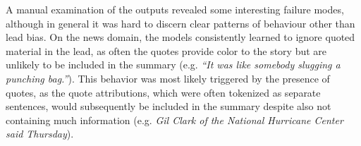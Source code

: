 A manual examination of the outputs revealed some interesting failure modes,
although in general it was hard to discern clear patterns of behaviour 
other than lead bias. On the news domain, the models consistently learned 
to ignore quoted material in the lead, as often the quotes provide
color to the story but are unlikely to be included in the summary (e.g. \textit{``It was like somebody slugging a punching bag.''}). 
This behavior was most likely triggered by the presence of quotes, as the
quote attributions, which were often tokenized as separate sentences,
would subsequently be included in the summary despite also not containing 
much information 
(e.g. \textit{Gil Clark of the National Hurricane Center said Thursday}). 




%


